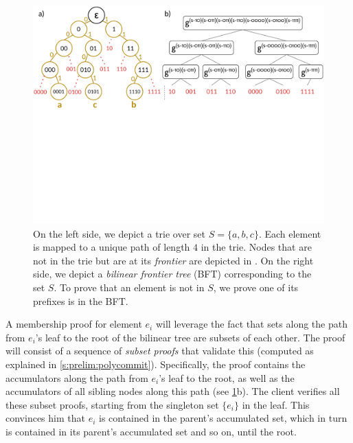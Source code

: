 \begin{figure}[t]
    \centering
    \includegraphics[width=1.00\columnwidth]{figures/AT.pdf}
    \vspace{-4.0cm}
    \caption{
        On the left side, we depict a trie over set $S = \{a,b,c\}$.
        Each element is mapped to a unique path of length $4$ in the trie.
        Nodes that are not in the trie but are at its \textit{frontier} are depicted in .
        On the right side, we depict a \textit{bilinear frontier tree} (BFT) corresponding to the set $S$.
        To prove that an element is not in $S$, we prove one of its prefixes is in the BFT.
        \label{f:accumulated-tree}}
    \vspace{-2.5em}
\end{figure}

A membership proof for element $e_i$ will leverage the fact that sets along the path from $e_i$'s leaf to the root of the bilinear tree are subsets of each other.
The proof will consist of a sequence of \textit{subset proofs} that validate this (computed as explained in \cref{s:prelim:polycommit}).
Specifically, the proof contains the accumulators along the path from $e_i$'s leaf to the root, as well as the accumulators of all sibling nodes along this path (see \cref{f:accumulated-tree}b).
The client verifies all these subset proofs, starting from the singleton set $\{e_i\}$ in the leaf.
This convinces  him that $e_i$ is contained in the parent's accumulated set, which in turn is contained in its parent's accumulated set and so on, until the root.

